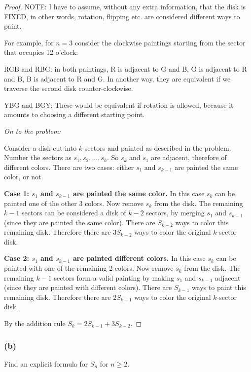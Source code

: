 \documentclass[14pt]{extarticle}
\begin{document}
\begin{proof}
     NOTE: I have to assume, without any extra information, that the disk is FIXED, in other words, rotation, flipping etc.
     are considered different ways to paint.

     For example, for \(n=3\) consider the clockwise paintings starting from the sector that occupies 12 o'clock:

     RGB and RBG: in both paintings, R is adjacent to G and B, G is adjacent to R and B, B is adjacent to R and G. In
     another way, they are equivalent if we traverse the second disk counter-clockwise.

     YBG and BGY: These would be equivalent if rotation is allowed, because it amounts to choosing a different starting point.

          {\it On to the problem:}

     Consider a disk cut into \(k\) sectors and painted as described in the problem. Number the sectors as \(s_1, s_2,
     \ldots, s_k\). So \(s_k\) and \(s_1\) are adjacent, therefore of different colors. There are two cases: either
     \(s_1\) and \(s_{k-1}\) are painted the same color, or not.

          {\bf Case 1: \(s_1\) and \(s_{k-1}\) are painted the same color.} In this case \(s_k\) can be painted one of the
     other 3 colors. Now remove \(s_k\) from the disk. The remaining \(k-1\) sectors can be considered a disk of
     \(k-2\) sectors, by merging \(s_1\) and \(s_{k-1}\) (since they are painted the same color). There are \(S_{k-2}\)
     ways to color this remaining disk. Therefore there are \(3S_{k-2}\) ways to color the original \(k\)-sector disk.

          {\bf Case 2: \(s_1\) and \(s_{k-1}\) are painted different colors.} In this case \(s_k\) can be painted with one of
     the remaining 2 colors. Now remove \(s_k\) from the disk. The remaining \(k-1\) sectors form a valid painting by
     making \(s_1\) and \(s_{k-1}\) adjacent (since they are painted with different colors). There are \(S_{k-1}\) ways
     to paint this remaining disk. Therefore there are \(2S_{k-1}\) ways to color the original \(k\)-sector disk.

     By the addition rule \(S_k = 2S_{k-1} + 3S_{k-2}\).
\end{proof}

\subsubsection{(b)}
Find an explicit formula for \(S_n\) for \(n \geq 2\).
\end{document}
